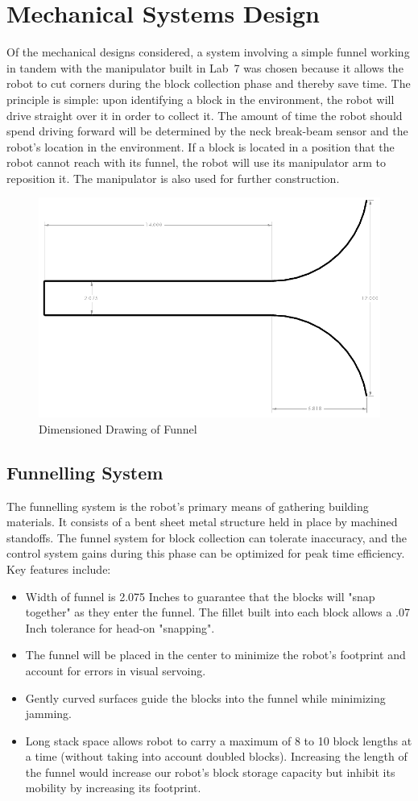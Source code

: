 \documentclass[letterpaper,11pt]{article}
\begin{document}
\section{Mechanical Systems Design}
Of the mechanical designs considered, a system involving a simple funnel working in tandem with the manipulator built in Lab~7 was chosen because it allows the robot to cut corners during the block collection phase and thereby save time. The principle is simple: upon identifying a block in the environment, the robot will drive straight over it in order to collect it. The amount of time the robot should spend driving forward will be determined by the neck break-beam sensor and the robot's location in the environment. If a block is located in a position that the robot cannot reach with its funnel, the robot will use its manipulator arm to reposition it. The manipulator is also used for further construction.
\begin{figure}[h]
 \centering
  \includegraphics[width=4.5in]{images/Funnel}
\caption{Dimensioned Drawing of Funnel}
\label{fig:dimensioned}
\end{figure}
\subsection{Funnelling System}
The funnelling system is the robot's primary means of gathering building materials. It consists of a bent sheet metal structure held in place by machined standoffs. The funnel system for block collection can tolerate inaccuracy, and the control system gains during this phase can be optimized for peak time efficiency.
Key features include:
\begin{itemize}
\item Width of funnel is 2.075 Inches to guarantee that the blocks will "snap together" as they enter the funnel. The fillet built into each block allows a .07 Inch tolerance for head-on "snapping".
\item The funnel will be placed in the center to minimize the robot's footprint and account for errors in visual servoing. 
\item Gently curved surfaces guide the blocks into the funnel while minimizing jamming. 
\item Long stack space allows robot to carry a maximum of 8 to 10 block lengths at a time (without taking into account doubled blocks). Increasing the length of the funnel would increase our robot's block storage capacity but inhibit its mobility by increasing its footprint.
\end{itemize}
\end{document}
